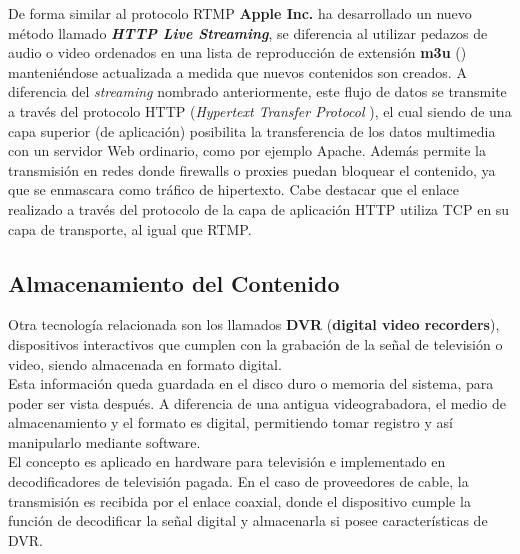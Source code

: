 	
	De forma similar al protocolo RTMP \textbf{Apple Inc.} ha desarrollado un nuevo método llamado \textit{\textbf{HTTP Live Streaming}}, se diferencia al utilizar pedazos de audio o video  ordenados en una lista de reproducción de extensión \textbf{m3u} (\cite{sota:m3u-specs}) manteniéndose actualizada a medida que nuevos contenidos son creados. A diferencia del \textit{streaming} nombrado anteriormente, este flujo de datos se transmite a través del protocolo HTTP (\textit{Hypertext Transfer Protocol} \cite{sota:rfc-http}), el cual siendo de una capa superior (de aplicación) posibilita la transferencia de los datos multimedia con un servidor Web ordinario, como por ejemplo Apache. Además permite la transmisión en redes donde firewalls o proxies puedan bloquear el contenido, ya que se enmascara como tráfico de hipertexto. Cabe destacar que el enlace realizado a través del protocolo de la capa de aplicación HTTP utiliza TCP en su capa de transporte, al igual que RTMP.

\subsection{Almacenamiento del Contenido}

Otra tecnología relacionada son los llamados \textbf{DVR} (\textbf{digital video recorders}), dispositivos interactivos que cumplen con la grabación de la señal de televisión o video, siendo almacenada en formato digital.\\

 Esta información queda guardada en el disco duro o memoria del sistema, para poder ser vista después. A diferencia de una antigua videograbadora, el medio de almacenamiento y el formato es digital, permitiendo tomar registro y así manipularlo mediante software.\\
 
	El concepto es aplicado en hardware para televisión e implementado en decodificadores de televisión pagada. En el caso de proveedores de cable, la transmisión es recibida por el enlace coaxial, donde el dispositivo cumple la función de decodificar la señal digital y almacenarla si posee características de DVR.

